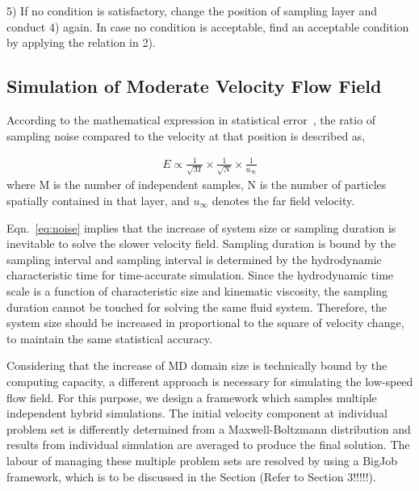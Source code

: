 \documentclass[preprint,12pt]{elsarticle}
\begin{document}
5) If no condition is satisfactory, change the position of sampling layer and conduct 4) again. In case no condition is acceptable, find an acceptable condition by applying the relation in 2).




\subsection{Simulation of Moderate Velocity Flow Field}
According to the mathematical expression in statistical error~\cite{Hadjicon3,Time_Mechanism}, the ratio of sampling noise compared to the velocity at that position is described as,

\vspace{-.2em}
\begin{eqnarray}
E \propto \frac{1}{\sqrt{M}} \times \frac{1}{\sqrt{N}} \times \frac{1}{u_{\infty}}
 \label{eq:noise}
\end{eqnarray}
where M is the number of independent samples, N is the number of particles spatially contained in that layer, and ${u_{\infty}}$ denotes the far field velocity.

Eqn.~\ref{eq:noise} implies that the increase of system size or sampling duration is inevitable to solve the slower velocity field. Sampling duration is bound by the sampling interval and sampling interval is determined by the hydrodynamic characteristic time for time-accurate simulation. Since the hydrodynamic time scale is a function of characteristic size and kinematic viscosity, the sampling duration cannot be touched for solving the same fluid system. Therefore, the system size should be increased in proportional to the square of velocity change, to maintain the same statistical accuracy.

Considering that the increase of MD domain size is technically bound by the computing capacity, a different approach is necessary for simulating the low-speed flow field. For this purpose, we design a framework which samples multiple independent hybrid simulations. The initial velocity component at individual problem set is differently determined from a Maxwell-Boltzmann distribution and results from individual simulation are averaged to produce the final solution. The labour of managing these multiple problem sets are resolved by using a BigJob framework, which is to be discussed in the Section (Refer to Section 3!!!!!).
\end{document}
